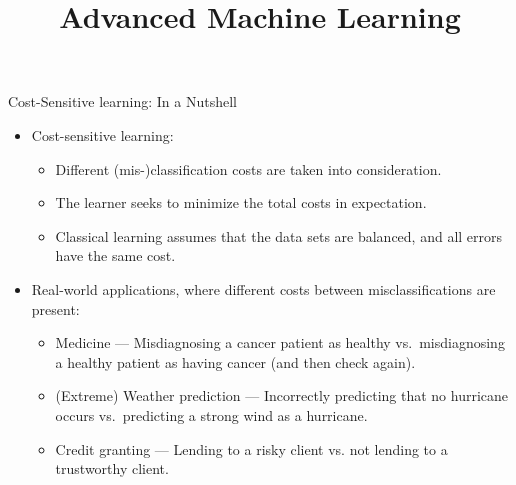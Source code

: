 \documentclass[11pt,compress,t,notes=noshow, xcolor=table]{beamer}
\title{Advanced Machine Learning}
\date{}
\begin{document}



\sloppy


\begin{vbframe}{Cost-Sensitive learning: In a Nutshell}
	\scriptsize{

		\begin{itemize}
		
    		\item Cost-sensitive learning: 
                \begin{itemize}
                    \scriptsize
                    \item Different (mis-)classification costs are taken into consideration.
                    \item The learner seeks to minimize the total costs in expectation.
                    \item Classical learning assumes that the data sets are balanced, and all errors have the same cost.
                \end{itemize}
    		
    		\item Real-world applications, where different costs between misclassifications are present:
      
    		\begin{itemize}
    			\scriptsize	
    			\item Medicine --- Misdiagnosing a cancer patient as healthy vs.\ misdiagnosing a healthy patient as having cancer (and then check again).
       
    			\item (Extreme) Weather prediction ---  Incorrectly predicting that no hurricane occurs vs.\ predicting a strong wind as a hurricane.
    	
    			\item Credit granting --- Lending to a risky client vs. not lending to a trustworthy client.
    		\end{itemize}
         
		
		\end{itemize}
        \vspace{15pt}

}
\end{vbframe}
\end{document}
